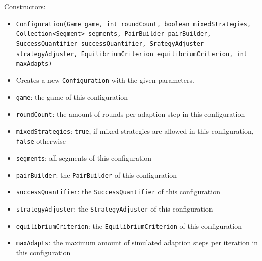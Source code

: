 \documentclass[parskip=full,11pt]{scrartcl}
\begin{document}
Constructors:
\begin{itemize}\itemsep -10pt
\item \texttt{Configuration(Game game, int roundCount, boolean mixedStrategies, Collection<Segment> segments, PairBuilder pairBuilder, SuccessQuantifier successQuantifier, SrategyAdjuster strategyAdjuster, EquilibriumCriterion equilibriumCriterion, int maxAdapts)}
\item[] Creates a new \texttt{Configuration} with the given parameters.
\item[] \texttt{game}: the game of this configuration
\item[] \texttt{roundCount}: the amount of rounds per adaption step in this configuration
\item[] \texttt{mixedStrategies}: \texttt{true}, if mixed strategies are allowed in this configuration, \texttt{false} otherwise
\item[] \texttt{segments}: all segments of this configuration
\item[] \texttt{pairBuilder}: the \texttt{PairBuilder} of this configuration
\item[] \texttt{successQuantifier}: the \texttt{SuccessQuantifier} of this configuration
\item[] \texttt{strategyAdjuster}: the \texttt{StrategyAdjuster} of this configuration
\item[] \texttt{equilibriumCriterion}: the \texttt{EquilibriumCriterion} of this configuration
\item[] \texttt{maxAdapts}: the maximum amount of simulated adaption steps per iteration in this configuration
\end{itemize}
\end{document}
